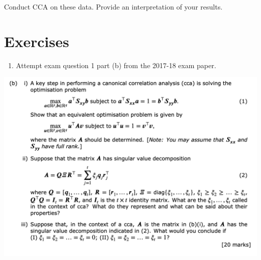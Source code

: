 \documentclass[
]{book}
\providecommand{\tightlist}{%
  \setlength{\itemsep}{0pt}\setlength{\parskip}{0pt}}
\theoremstyle{definition}
\theoremstyle{definition}
\theoremstyle{definition}
\theoremstyle{definition}
\theoremstyle{remark}
\begin{document}
Conduct CCA on these data. Provide an interpretation of your results.

\hypertarget{exercises-2}{%
\section{Exercises}\label{exercises-2}}

\begin{enumerate}
\def\labelenumi{\arabic{enumi}.}
\tightlist
\item
  Attempt exam question 1 part (b) from the 2017-18 exam paper.
\end{enumerate}

\includegraphics{figs/CCA_2017_18_Q1.png}
\end{document}
